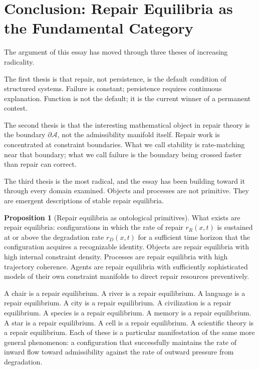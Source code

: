 \documentclass[11pt, a4paper]{article}
\theoremstyle{definition}
\newtheorem{proposition}{Proposition}
\theoremstyle{remark}
\begin{document}
\section{Conclusion: Repair Equilibria as the Fundamental Category}

The argument of this essay has moved through three theses of increasing
radicality.

The first thesis is that repair, not persistence, is the default condition of
structured systems. Failure is constant; persistence requires continuous
explanation. Function is not the default; it is the current winner of a
permanent contest.

The second thesis is that the interesting mathematical object in repair theory
is the boundary $\partial\mathcal{A}$, not the admissibility manifold itself.
Repair work is concentrated at constraint boundaries. What we call stability
is rate-matching near that boundary; what we call failure is the boundary being
crossed faster than repair can correct.

The third thesis is the most radical, and the essay has been building toward
it through every domain examined. Objects and processes are not primitive.
They are emergent descriptions of stable repair equilibria.

\begin{proposition}[Repair equilibria as ontological primitives]
What exists are repair equilibria: configurations in which the rate of repair
$r_R(x, t)$ is sustained at or above the degradation rate $r_D(x, t)$ for a
sufficient time horizon that the configuration acquires a recognizable identity.
Objects are repair equilibria with high internal constraint density.
Processes are repair equilibria with high trajectory coherence. Agents are
repair equilibria with sufficiently sophisticated models of their own constraint
manifolds to direct repair resources preventively.
\end{proposition}

A chair is a repair equilibrium. A river is a repair equilibrium. A language
is a repair equilibrium. A city is a repair equilibrium. A civilization is a
repair equilibrium. A species is a repair equilibrium. A memory is a repair
equilibrium. A star is a repair equilibrium. A cell is a repair equilibrium.
A scientific theory is a repair equilibrium. Each of these is a particular
manifestation of the same more general phenomenon: a configuration that
successfully maintains the rate of inward flow toward admissibility against
the rate of outward pressure from degradation.
\end{document}
